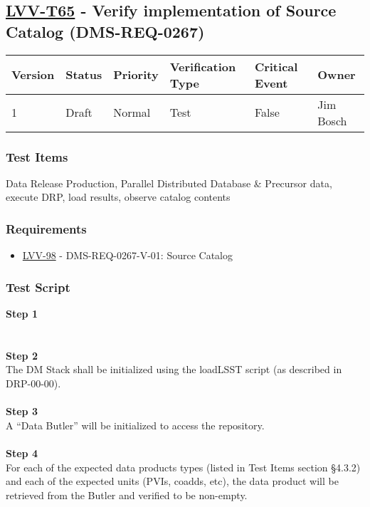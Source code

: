 \hypertarget{lvv-t65---verify-implementation-of-source-catalog-dms-req-0267}{%
\subsection{\texorpdfstring{\href{https://jira.lsstcorp.org/secure/Tests.jspa\#/testCase/LVV-T65}{LVV-T65}
- Verify implementation of Source Catalog
(DMS-REQ-0267)}{LVV-T65 - Verify implementation of Source Catalog (DMS-REQ-0267)}}\label{lvv-t65---verify-implementation-of-source-catalog-dms-req-0267}}

\begin{longtable}[]{@{}llllll@{}}
\toprule
Version & Status & Priority & Verification Type & Critical Event &
Owner\tabularnewline
\midrule
\endhead
1 & Draft & Normal & Test & False & Jim Bosch\tabularnewline
\bottomrule
\end{longtable}

\hypertarget{test-items-41}{%
\subsubsection{Test Items}\label{test-items-41}}

Data Release Production, Parallel Distributed Database \& Precursor
data, execute DRP, load results, observe catalog contents

\hypertarget{requirements-42}{%
\subsubsection{Requirements}\label{requirements-42}}

\begin{itemize}
\tightlist
\item
  \href{https://jira.lsstcorp.org/browse/LVV-98}{LVV-98} -
  DMS-REQ-0267-V-01: Source Catalog
\end{itemize}

\hypertarget{test-script-42}{%
\subsubsection{Test Script}\label{test-script-42}}

\textbf{Step 1}\\
~\\
~\\
\textbf{Step 2}\\
The DM Stack shall be initialized using the loadLSST script (as
described in DRP-00-00).\\
~\\
\textbf{Step 3}\\
A ``Data Butler'' will be initialized to access the repository.\\
~\\
\textbf{Step 4}\\
For each of the expected data products types (listed in Test Items
section §4.3.2) and each of the expected units (PVIs, coadds, etc), the
data product will be retrieved from the Butler and verified to be
non-empty.\\
~\\
~\\
~\\

